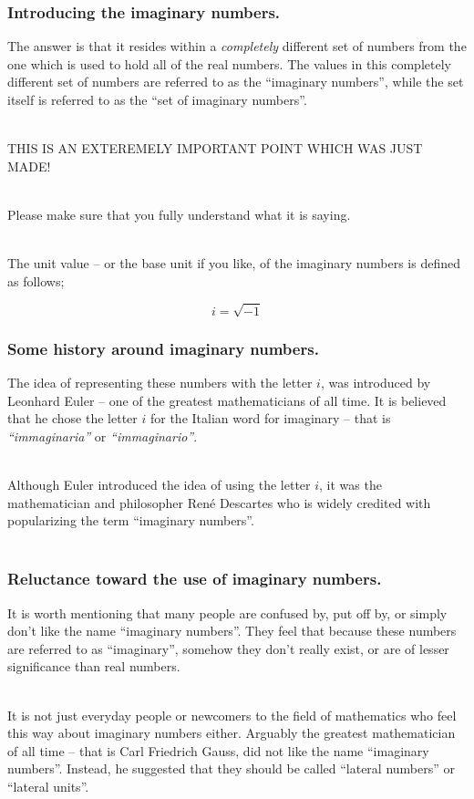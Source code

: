 %
%

\begin{frame}
\frametitle{Introducing the imaginary numbers.}

The answer is that it resides within a \textit{completely} different set of numbers from the one which is used to hold all of the real numbers. The values in this
completely different set of numbers are referred to as the ``imaginary numbers'', while the set itself is referred to as the ``set of imaginary numbers''.\\~\ 

THIS IS AN EXTEREMELY IMPORTANT POINT WHICH WAS JUST MADE!\\~\

Please make sure that you fully understand what it is saying.\\~\

The unit value -- or the base unit if you like, of the imaginary numbers is defined as follows;

\begin{equation}
  i = \sqrt{-1}
\end{equation}

\end{frame}


\begin{frame}
\frametitle{Some history around imaginary numbers.}

The idea of representing these numbers with the letter \(i\), was introduced by Leonhard Euler -- one of the greatest mathematicians of all time. It is believed
that he chose the letter \(i\) for the Italian word for imaginary -- that is \textit{``immaginaria''} or \textit{``immaginario''}.\\~\

Although Euler introduced the idea of using the letter \(i\), it was the mathematician and philosopher Ren\'e Descartes who is widely credited with popularizing
the term ``imaginary numbers''.\\~\

\end{frame}


%
%

\begin{frame}
\frametitle{Reluctance toward the use of imaginary numbers.}

It is worth mentioning that many people are confused by, put off by, or simply don't like the name ``imaginary numbers''. They feel that because these numbers
are referred to as ``imaginary'', somehow they don't really exist, or are of lesser significance than real numbers.\\~\

It is not just everyday people or newcomers to the field of mathematics who feel this way about imaginary numbers either. Arguably the greatest mathematician
of all time -- that is Carl Friedrich Gauss, did not like the name ``imaginary numbers''. Instead, he suggested that they should be called ``lateral numbers'' or
``lateral units''.\\~\

\end{frame}


